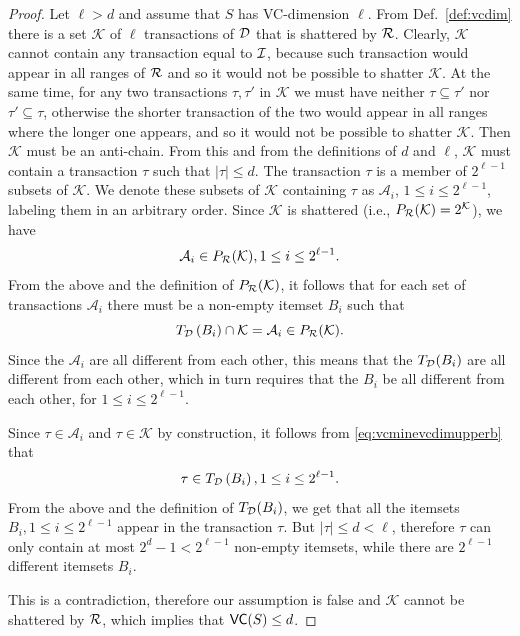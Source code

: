 \begin{proof}
  Let $\ell>d$ and assume that $S$ has
  VC-dimension $\ell$. From Def.~\ref{def:vcdim} there is a set $\mathcal{K}$ of $\ell$
  transactions of ${\cal D}$ that is shattered by $\mathcal{R}$. Clearly, $\mathcal{K}$ cannot
  contain any transaction equal to ${\cal I}$, because such transaction would appear
  in all ranges of $\mathcal{R}$ and so it would not be possible to shatter $\mathcal{K}$.
  At the same time, for any two transactions $\tau,\tau'$ in
  $\mathcal{K}$ we must have neither $\tau\subseteq\tau'$ nor
  $\tau'\subseteq\tau$, otherwise the shorter transaction of the two would appear in
  all ranges where the longer one appears, and so it would not be possible to
  shatter $\mathcal{K}$. Then $\mathcal{K}$ must be an anti-chain. From this and
  from the definitions of $d$ and $\ell$, $\mathcal{K}$ must contain a
  transaction $\tau$ such that $|\tau|\le d$. %
  The transaction
  $\tau$ is a member of $2^{\ell-1}$ subsets of $\mathcal{K}$. We denote these subsets of $\mathcal{K}$ containing $\tau$ as
  $\mathcal{A}_i$, $1\le i\le 2^{\ell-1}$, labeling them in an
  arbitrary order. Since $\mathcal{K}$ is shattered (i.e., $P_{\mathcal{R}}(\mathcal{K})=2^\mathcal{K}$), we have
  \[ 
  \mathcal{A}_i\in P_{\mathcal{R}}(\mathcal{K}), 1\le i\le 2^{\ell -1}.
  \]
  From the above and the definition of $P_{\mathcal{R}}(\mathcal{K})$, it follows that for
  each set of transactions $\mathcal{A}_i$ there must be a
  non-empty itemset $B_i$ such that 
  \begin{equation}\label{eq:vcminevcdimupperb}
  T_{\cal D}\left(B_i\right)\cap \mathcal{K}= \mathcal{A}_i \in P_{\mathcal{R}}(\mathcal{K}).
  \end{equation}
  Since the $\mathcal{A}_i$ are all different from each other, this
  means that the $T_{\cal D}(B_i)$ are all different from each other, which
  in turn requires that the $B_i$ be all different from each other,
  for $1\le i\le 2^{\ell-1}$. 

  Since $\tau \in \mathcal{A}_i$ and $\tau \in \mathcal{K}$ by
  construction, it follows from \eqref{eq:vcminevcdimupperb} that 
  \[
  \tau \in T_{\cal D}\left(B_i\right), 1\le i\le 2^{\ell-1}.
  \]
  From the above and the definition of $T_{\cal D}(B_i)$, we get that all the
  itemsets $B_i, 1\le i\le 2^{\ell-1}$ appear in the transaction
  $\tau$. But $|\tau|\le d < \ell$, therefore $\tau$ can only contain at most $2^d-1 <
  2^{\ell -1}$ non-empty itemsets, while there are $2^{\ell-1}$ different
  itemsets $B_i$.

  This is a contradiction, therefore our assumption is false and
  $\mathcal{K}$ cannot be shattered by $\mathcal{R}$, which implies that $\mathsf{VC}(S)\le d$.
\end{proof}

